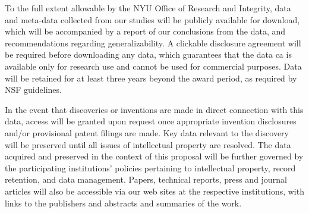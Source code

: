 To the full extent allowable by the NYU Office of Research and Integrity, data and meta-data collected from our studies will be publicly available for download, which will be accompanied by a report of our conclusions from the data, and recommendations regarding generalizability. A clickable disclosure agreement will be required before downloading any data, which guarantees that the data ca is available only for research use and cannot be used for commercial purposes. Data will be retained for at least three years beyond the award period, as required by NSF guidelines.

In the event that discoveries or inventions are made in direct connection with this data, access will be granted upon request once appropriate invention disclosures and/or provisional patent filings are made. Key data relevant to the discovery will be preserved until all issues of intellectual property are resolved. The data acquired and preserved in the context of this proposal will be further governed by the participating institutions' policies pertaining to intellectual property, record retention, and data management. Papers, technical reports, press and journal articles will also be accessible via our web sites at the respective institutions, with links to the publishers and abstracts and summaries of the work.

